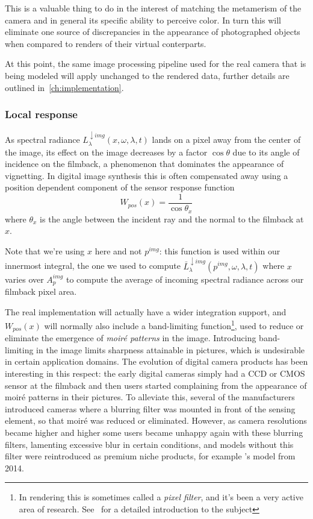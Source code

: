This is a valuable thing to do in the interest of matching the metamerism of the 
camera and in general its specific ability to perceive color. 
In turn this will eliminate one source of discrepancies in the appearance of 
photographed objects when compared to renders of their virtual conterparts.

At this point, the same image processing pipeline used for the real camera
that is being modeled will apply unchanged to the rendered data, further 
details are outlined in~\cref{ch:implementation}.


\subsubsection{Local response}
As spectral radiance $L^{\downarrow img}_{\lambda}(x, \omega, \lambda, t)$ lands
on a pixel away from the center of the image, its effect on the image decreases 
by a factor $\cos\theta$ due to its angle of incidence on the filmback, a 
phenomenon that dominates the appearance of vignetting. 
In digital image synthesis this is often compensated away using a position 
dependent component of the sensor response function
\begin{equation}
	W_{pos}(x) = \frac{1}{\cos\theta_{x}}
\end{equation}
where $\theta_{x}$ is the angle between the incident ray and the normal to the
filmback at $x$. 

Note that we're using $x$ here and not $p^{img}$: this function is used within
our innermost integral, the one we used to compute  
$\bar L^{\downarrow img}_{\lambda}(p^{img}, \omega, \lambda, t)$
where $x$ varies over $A_p^{img}$ to compute the average of incoming
spectral \gls{radiance} across our filmback pixel area.

The real implementation will actually have a wider integration support,
and $W_{pos}(x)$ will normally also include a band-limiting function\footnote{
	In rendering this is sometimes called a \textsl{\gls{pixel filter}}, and it's 
	been a very active area of research. See~\cite{pharr2023} for a detailed
	introduction to the subject}, 
used to reduce or eliminate the emergence of \emph{moir\'e patterns} in the image. 
Introducing band-limiting in the image limits sharpness attainable in pictures,
which is undesirable in certain application domains. 
The evolution of digital camera products has been interesting in this respect:
the early digital cameras simply had a \gls{CCD} or \gls{CMOS} sensor at the 
filmback and then users started complaining from the appearance of moir\'e 
patterns in their pictures. 
To alleviate this, several of the manufacturers introduced cameras where a 
blurring filter was mounted in front of the sensing element, 
so that moir\'e was reduced or eliminated. 
However, as camera resolutions became higher and higher some users became unhappy again
with these blurring filters, lamenting excessive blur in certain conditions, 
and models without this filter were reintroduced as premium niche products, 
for example 's  model from 2014.


